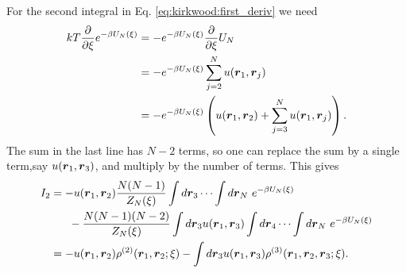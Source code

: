 For the second integral in Eq. \eqref{eq:kirkwood:first_deriv} we need
\begin{align}
kT \frac{\partial}{\partial \xi} 
    e^{-\beta U_N(\xi)} 
&= - e^{-\beta U_N(\xi)} \frac{\partial}{\partial \xi}
    U_N \\
&= - e^{-\beta U_N(\xi)} \sum_{j=2}^N u(\boldsymbol{r}_1,\boldsymbol{r}_j) \\
&=- e^{-\beta U_N(\xi)}\left(
    u(\boldsymbol{r}_1,\boldsymbol{r}_2) +  \sum_{j=3}^N u(\boldsymbol{r}_1,\boldsymbol{r}_j)
    \right).
\end{align}
The sum in the last line has $N-2$ terms, so one can
replace the sum by a single term,say $u(\boldsymbol{r}_1,\boldsymbol{r}_3)$, and multiply by the number of terms.
This gives
\begin{align}
I_2 &= -u(\boldsymbol{r}_1,\boldsymbol{r}_2) \frac{N(N-1)}{Z_N(\xi)}
    \int d\boldsymbol{r}_3 \cdots \int d\boldsymbol{r}_N~ e^{-\beta U_N(\xi)}\\
    &~~~~~- \frac{N(N-1)(N-2)}{Z_N(\xi)}
        \int d\boldsymbol{r}_3 u(\boldsymbol{r}_1,\boldsymbol{r}_3) \int d\boldsymbol{r}_4 \cdots
        \int d\boldsymbol{r}_N~ e^{-\beta U_N(\xi)} \\
&= -u(\boldsymbol{r}_1,\boldsymbol{r}_2)\rho^{(2)}(\boldsymbol{r}_1,\boldsymbol{r}_2;\xi) 
    - \int d\boldsymbol{r}_3 u(\boldsymbol{r}_1,\boldsymbol{r}_3) \rho^{(3)}(\boldsymbol{r}_1,\boldsymbol{r}_2,\boldsymbol{r}_3;\xi).
\end{align}

